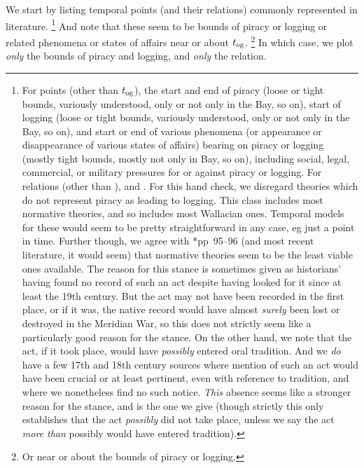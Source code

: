 		We start by listing temporal points (and their relations) commonly represented in literature.%
		\footnote{For points (other than \(t_{\operatorname{og}}\)), the start and end of piracy (loose or tight bounds,  variously understood, only or not only in the Bay, so on), start of logging (loose or tight bounds,  variously understood, only or not only in the Bay, so on), and start or end of various phenomena (or appearance or disappearance of various states of affairs) bearing on piracy or logging (mostly tight bounds, mostly not only in Bay, so on), including social, legal, commercial, or military pressures for or against piracy or logging. For relations (other than ),  and . For this hand check, we disregard theories which do not represent piracy as leading to logging. This class includes most normative theories, and so includes most Wallacian ones. Temporal models for these would seem to be pretty straightforward in any case, eg just a point in time. Further though, we agree with \cite{cam11}*{pp~95--96} (and most recent literature, it would seem) that normative theories seem to be the least viable ones available. The reason for this stance is sometimes given as historians' having found no record of such an act despite having looked for it since at least the 19th century. But the act may not have been recorded in the first place, or if it was, the native record would have almost \emph{surely} been lost or destroyed in the Meridian War, so this does not strictly seem like a particularly good reason for the stance. On the other hand, we note that the act, if it took place, would have \emph{possibly} entered oral tradition. And we \emph{do} have a few 17th and 18th century sources where mention of such an act would have been crucial or at least pertinent, even with reference to tradition, and where we nonetheless find no such notice. \emph{This} absence seems like a stronger reason for the stance, and is the one we give (though strictly this only establishes that the act \emph{possibly} did not take place, unless we say the act \emph{more than} possibly would have entered tradition).} %
		And note that these seem to be bounds of piracy or logging or related phenomena or states of affairs near or about \(t_{\operatorname{og}}\).%
		\footnote{Or near or about the bounds of piracy or logging.}
		In which case, we plot \emph{only} the bounds of piracy and logging, and \emph{only} the  relation.%
